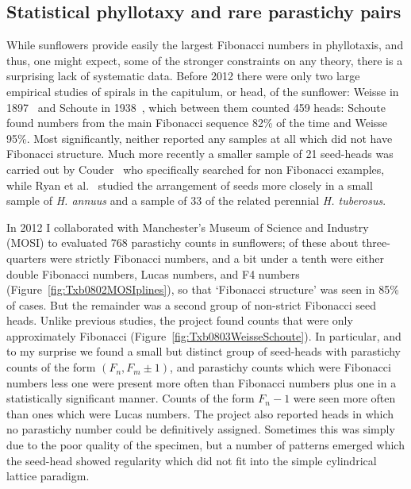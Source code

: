   \subsection{Statistical phyllotaxy and rare parastichy pairs}
  While sunflowers provide easily the largest Fibonacci numbers in phyllotaxis, and thus, one might expect, some of the stronger
  constraints on any theory, there is a surprising lack of systematic data.
  Before 2012 there were only two large empirical studies of spirals in the capitulum, or head, of the sunflower: Weisse in 1897~\cite{weisseZahlRandbluthenCompositenkopfchen1897} and Schoute in 1938~\cite{schouteWhorledPhyllotaxisIV1938}, which between them counted 459 heads: Schoute found numbers from the main Fibonacci sequence 82\% of the time and Weisse 95\%. 
  Most significantly, neither reported any samples at all which did not have Fibonacci structure. 
  Much more recently a smaller sample of 21 seed-heads was carried out 
  by Couder~\cite{couderInitialTransitionsOrder1998} who specifically searched for non Fibonacci examples, while
  Ryan et al.~\cite{ryanQuantitativeAnalysisSunflower1990} studied the arrangement of seeds more closely in a small sample of \emph{H. annuus} and a sample of 33 of the
  related perennial \emph{H. tuberosus}. 
  
 In 2012 I collaborated with Manchester's Museum of Science and Industry (MOSI)\autocite{swintonNovelFibonacciNonFibonacci2016} to evaluated 768 parastichy counts in sunflowers; of these about three-quarters were strictly 
 Fibonacci numbers, and a bit under a tenth
  were either  double Fibonacci numbers, Lucas numbers, and F4 numbers (Figure~\ref{fig:Txb0802MOSIplines}), so that `Fibonacci structure' was seen in 85\% of cases. 
 But the remainder was a second group of non-strict Fibonacci seed heads.  Unlike previous studies, the project  found counts that were only approximately Fibonacci (Figure~\ref{fig:Txb0803WeisseSchoute}).
  In particular, and to my surprise we found a small but distinct group of seed-heads with parastichy counts of the form $(F_n,F_{m}\pm 1)$, and parastichy counts which were  Fibonacci numbers 
  less one  were present more often than   Fibonacci numbers plus one in a statistically significant manner. Counts of the form $F_n-1$ were seen more often than ones which were Lucas numbers.
  The project also reported heads in which no parastichy number could be definitively assigned. Sometimes this was simply due to the poor quality of the specimen, but a number of patterns emerged which the seed-head showed regularity which did not fit into the simple cylindrical lattice paradigm. 
  

